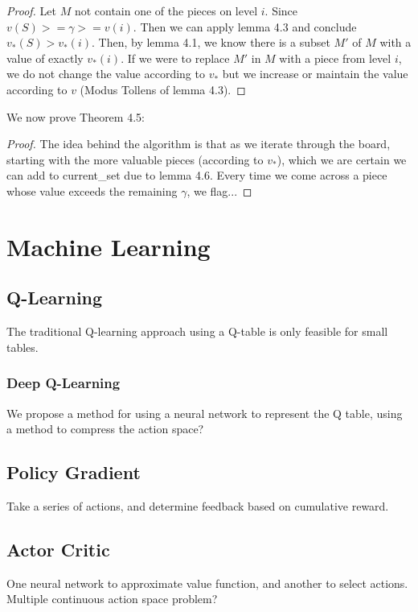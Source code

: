 \documentclass{article}
\theoremstyle{plain}
\theoremstyle{definition}
\theoremstyle{remark}
\begin{document}
\begin{proof}
Let $M$ not contain one of the pieces on level $i$. Since $v(S) >= \gamma >= v(i)$. Then we can apply lemma 4.3 and conclude $v_{*}(S) > v_{*}(i)$. Then, by lemma 4.1, we know there is a subset $M'$ of $M$ with a value of exactly $v_{*}(i)$. If we were to replace $M'$ in $M$ with a piece from level $i$, we do not change the value according to $v_{*}$ but we increase or maintain the value according to $v$ (Modus Tollens of lemma 4.3). 
\end{proof}

We now prove Theorem 4.5:

\begin{proof}
The idea behind the algorithm is that as we iterate through the board, starting with the more valuable pieces (according to $v_{*}$), which we are certain we can add to current\_set due to lemma 4.6. Every time we come across a piece whose value exceeds the remaining $\gamma$, we flag... 
\end{proof}

\section{Machine Learning}
\subsection{Q-Learning}
The traditional Q-learning approach using a Q-table is only feasible for small tables.
\subsubsection{Deep Q-Learning}
We propose a method for using a neural network to represent the Q table, using a method to compress the action space?

\subsection{Policy Gradient}
Take a series of actions, and determine feedback based on cumulative reward.
\subsection{Actor Critic}
One neural network to approximate value function, and another to select actions.
Multiple continuous action space problem?
\end{document}
